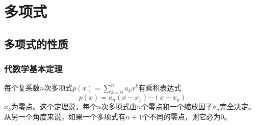 \chapter{多项式}

\section{多项式的性质}
\subsection{代数学基本定理}
\begin{theorem}[代数学基本定理]\label{basic-theorem-in-algebra}
每个复系数$n$次多项式$p(x)=\sum_{k=0}^{n}a_kx^k$有乘积表达式
$$p(x)=a_n(x-x_1)\cdots(x-x_n)$$
$x_k$为零点。这个定理说，每个$n$次多项式由$n$个零点和一个缩放因子$a_n$完全决定。从另一个角度来说，如果一个多项式有$n+1$个不同的零点，则它必为0。
\end{theorem}
